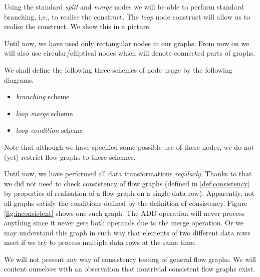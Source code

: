 Using the standard \emph{split} and \emph{merge} nodes we will be able to perform standard branching, i.e., to realise the  construct. The \emph{loop} node construct will allow us to realise the  construct. We show this in a picture.

\begin{rem}
  Until now, we have used only rectangular nodes in our graphs. From now on we will also use circular/elliptical nodes which will denote connected parts of graphs.
\end{rem}

We shall define the following three schemes of node usage by the following diagrams.
\begin{itemize}
  \item \emph{branching} scheme
  \item \emph{loop merge} scheme
  \item \emph{loop condition} scheme
\end{itemize}
\myenddef

\begin{rem}
  Note that although we have specified some possible use of these nodes, we do not (yet) restrict flow graphs to these schemes.
\end{rem}

Until now, we have performed all data transformations \emph{regularly}. Thanks to that we did not need to check consistency of flow graphs (defined in \ref{def:consistency} by properties of realisation of a flow graph on a single data row).  Apparently, not all graphs satisfy the conditions defined by the definition of consistency. Figure \ref{fig:inconsistent} shows one such graph. The ADD operation will never process anything since it never gets both operands due to the merge operation. Or we may understand this graph in such way that elements of two different data rows meet if we try to process multiple data rows at the same time.


We will not present any way of consistency testing of general flow graphs. We will content ourselves with an observation that nontrivial consistent flow graphs exist.

